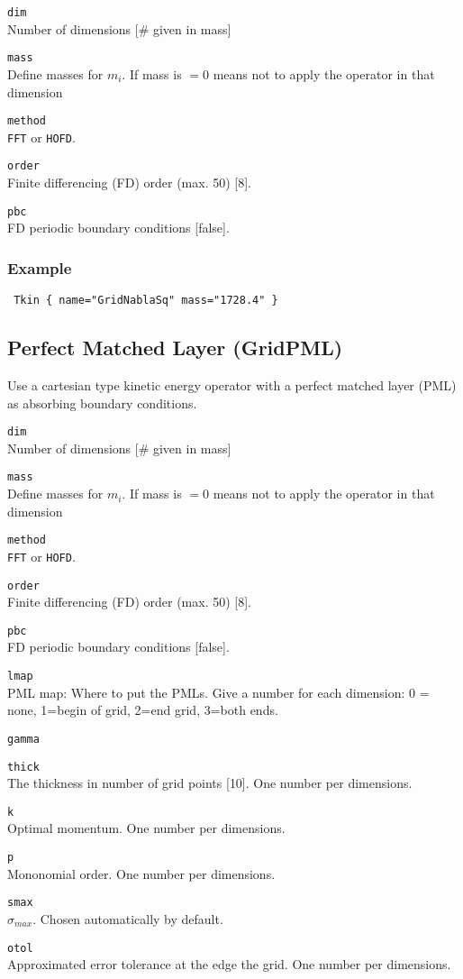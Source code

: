 \documentclass[a4paper,12pt]{scrbook}
\newcommand{\option}[2]{\item \texttt{#1}\\ #2}
\newcommand{\code}[1]{\texttt{#1}}
\begin{document}
\begin{options}
 \option{dim}{Number of dimensions [\# given in mass]}
 \option{mass}{Define masses for $m_i$. If mass is $= 0$ means not to apply the operator in that dimension}
 \option{method}{\code{FFT} or \code{HOFD}.}
 \option{order}{Finite differencing (FD) order (max. 50) [8].}
 \option{pbc}{FD periodic boundary conditions [false].}
\end{options}

\subsubsection*{Example}
\begin{verbatim}
 Tkin { name="GridNablaSq" mass="1728.4" }
\end{verbatim}

\subsection{Perfect Matched Layer (GridPML)}
Use a cartesian type kinetic energy operator with a perfect matched layer (PML) \cite{Nissen10} as
absorbing boundary conditions.

\begin{options}
 \option{dim}{Number of dimensions [\# given in mass]}
 \option{mass}{Define masses for $m_i$. If mass is $= 0$ means not to apply the operator in that dimension}
 \option{method}{\code{FFT} or \code{HOFD}.}
 \option{order}{Finite differencing (FD) order (max. 50) [8].}
 \option{pbc}{FD periodic boundary conditions [false].}
 \option{lmap}{PML map: Where to put the PMLs. Give a number for each dimension: 0 = none, 1=begin of grid, 2=end grid, 3=both ends.}
 \option{gamma}{}
 \option{thick}{The thickness in number of grid points [10]. One number per dimensions.}
 \option{k}{Optimal momentum. One number per dimensions.}
 \option{p}{Mononomial order. One number per dimensions.}
 \option{smax}{$\sigma_{max}$. Chosen automatically by default.}
 \option{otol}{Approximated error tolerance at the edge the grid. One number per dimensions.}
\end{options}
\end{document}
